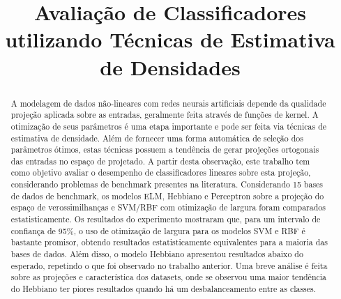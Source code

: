\documentclass[conference]{IEEEtran}
\begin{document}
	
	\title{Avaliação de Classificadores utilizando Técnicas de Estimativa de Densidades}
	
	
	\author{
		}
	
	
	
	\maketitle
	
	\begin{abstract}
		A modelagem de dados não-lineares com redes neurais artificiais depende da qualidade projeção aplicada sobre as entradas, geralmente feita através de funções de kernel. A otimização de seus parâmetros é uma etapa importante e pode ser feita via técnicas de estimativa de densidade. Além de fornecer uma forma automática de seleção dos parâmetros ótimos, estas técnicas possuem a tendência de gerar projeções ortogonais das entradas no espaço de projetado. A partir desta observação, este trabalho tem como objetivo avaliar o desempenho de classificadores lineares sobre esta projeção, considerando problemas de benchmark presentes na literatura. Considerando 15 bases de dados de benchmark, os modelos ELM, Hebbiano e Perceptron sobre a projeção do espaço de verossimilhanças e SVM/RBF com otimização de largura foram comparados estatisticamente. Os resultados do experimento mostraram que, para um intervalo de confiança de 95\%, o uso de otimização de largura para os modelos SVM e RBF é bastante promisor, obtendo resultados estatisticamente equivalentes para a maioria das bases de dados. Além disso, o modelo Hebbiano apresentou resultados abaixo do esperado, repetindo o que foi observado no trabalho anterior. Uma breve análise é feita sobre as projeções e característica dos datasets, onde se observou uma maior tendência do Hebbiano ter piores resultados quando há um desbalanceamento entre as classes.
	\end{abstract}
\end{document}
